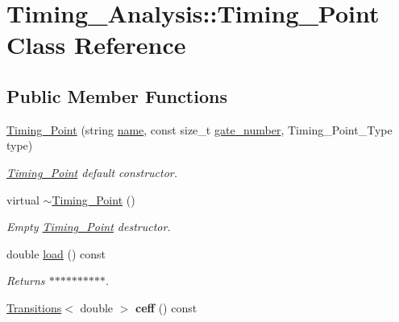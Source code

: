 \hypertarget{classTiming__Analysis_1_1Timing__Point}{\section{Timing\-\_\-\-Analysis\-:\-:Timing\-\_\-\-Point Class Reference}
\label{classTiming__Analysis_1_1Timing__Point}
}
\subsection*{Public Member Functions}
\begin{DoxyCompactItemize}
\item 
\hyperlink{classTiming__Analysis_1_1Timing__Point_a05b02a7c4e302a256b20bdabf79b37d1}{Timing\-\_\-\-Point} (string \hyperlink{classTiming__Analysis_1_1Timing__Point_aa4e767553f03fb8dea972d4443edc615}{name}, const size\-\_\-t \hyperlink{classTiming__Analysis_1_1Timing__Point_a9f8c6bbc7bc46a3d1ff81a984e76126f}{gate\-\_\-number}, Timing\-\_\-\-Point\-\_\-\-Type type)
\begin{DoxyCompactList}\small\item\em \hyperlink{classTiming__Analysis_1_1Timing__Point}{Timing\-\_\-\-Point} default constructor. \end{DoxyCompactList}\item 
virtual \hyperlink{classTiming__Analysis_1_1Timing__Point_a2c676cc95977d209cfa8fe0bcb40ec49}{$\sim$\-Timing\-\_\-\-Point} ()
\begin{DoxyCompactList}\small\item\em Empty \hyperlink{classTiming__Analysis_1_1Timing__Point}{Timing\-\_\-\-Point} destructor. \end{DoxyCompactList}\item 
double \hyperlink{classTiming__Analysis_1_1Timing__Point_aaca34298e068bdcc1655c50ee914b9f4}{load} () const 
\begin{DoxyCompactList}\small\item\em Returns $\ast$$\ast$$\ast$$\ast$$\ast$$\ast$$\ast$$\ast$$\ast$$\ast$. \end{DoxyCompactList}\item 
\hypertarget{classTiming__Analysis_1_1Timing__Point_aa68be5e44a1d56f3e6c98dff1efe60e5}{\hyperlink{classTransitions}{Transitions}$<$ double $>$ {\bfseries ceff} () const }\label{classTiming__Analysis_1_1Timing__Point_aa68be5e44a1d56f3e6c98dff1efe60e5}


\end{DoxyCompactItemize}
